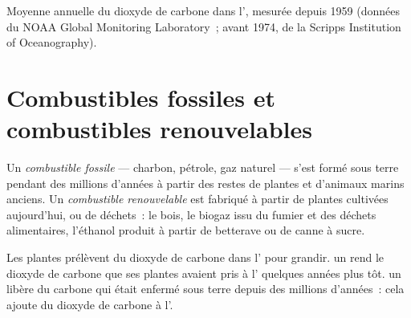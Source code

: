 \begin{omfigure}

{\small Moyenne annuelle du dioxyde de carbone dans l', mesurée
depuis 1959 (données du NOAA Global Monitoring Laboratory~; avant 1974,
de la Scripps Institution of Oceanography).}
\end{omfigure}

\section{Combustibles fossiles et combustibles renouvelables}

\begin{definition}\label{def:g8:combustion-and-fuels:fossil}
Un \emph{combustible fossile} --- charbon,
pétrole, gaz naturel --- s'est formé sous terre pendant des millions
d'années à partir des restes de plantes et d'animaux marins anciens. Un
\emph{combustible renouvelable} est
fabriqué à partir de plantes cultivées aujourd'hui, ou de déchets~: le
bois, le biogaz issu du fumier et des déchets alimentaires, l'éthanol
produit à partir de betterave ou de canne à sucre.
\end{definition}

\begin{proposition}\label{prop:g8:combustion-and-fuels:cycle}
Les plantes prélèvent du dioxyde de carbone dans l' pour grandir.
 un  rend le dioxyde de carbone que ses
plantes avaient pris à l' quelques années plus tôt.  un
 libère du carbone qui était enfermé sous terre
depuis des millions d'années~: cela ajoute du dioxyde de carbone à
l'.
\end{proposition}

